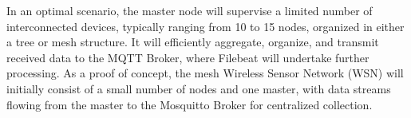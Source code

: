 In an optimal scenario, the master node will supervise a limited number of interconnected devices, typically ranging from 10 to 15 nodes, organized in either a tree or mesh structure. It will efficiently aggregate, organize, and transmit received data to the MQTT Broker, where Filebeat will undertake further processing. As a proof of concept, the mesh Wireless Sensor Network (WSN) will initially consist of a small number of nodes and one master, with data streams flowing from the master to the Mosquitto Broker for centralized collection.







